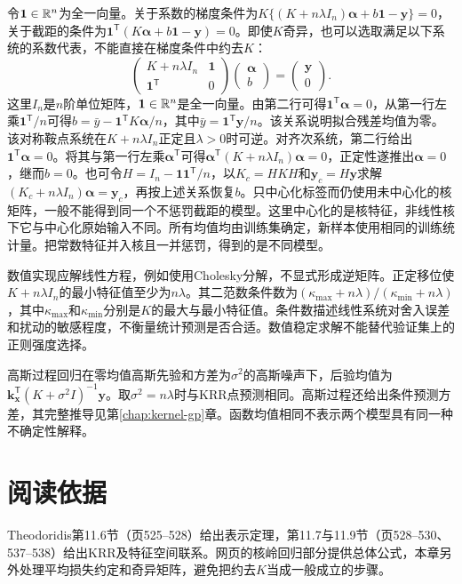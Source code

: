 令$\bm1\in\mathbb{R}^n$为全一向量。关于系数的梯度条件为$K\{(K+n\lambda I_n)\bm\alpha+b\bm1-\bm y\}=0$，关于截距的条件为$\bm1^{\mathsf T}(K\bm\alpha+b\bm1-\bm y)=0$。即使$K$奇异，也可以选取满足以下系统的系数代表，不能直接在梯度条件中约去$K$：
\begin{equation}
 \begin{pmatrix}K+n\lambda I_n&\bm1\\\bm1^{\mathsf T}&0\end{pmatrix}
 \begin{pmatrix}\bm\alpha\\b\end{pmatrix}
 =\begin{pmatrix}\bm y\\0\end{pmatrix}.
 \label{eq:krr-unpenalized-intercept}
\end{equation}
 这里$I_n$是$n$阶单位矩阵，$\bm1\in\mathbb{R}^n$是全一向量。由第二行可得$\bm1^{\mathsf T}\bm\alpha=0$，从第一行左乘$\bm1^{\mathsf T}/n$可得$b=\bar y-\bm1^{\mathsf T}K\bm\alpha/n$，其中$\bar y=\bm1^{\mathsf T}\bm y/n$。该关系说明拟合残差均值为零。该对称鞍点系统在$K+n\lambda I_n$正定且$\lambda>0$时可逆。对齐次系统，第二行给出$\bm1^{\mathsf T}\bm\alpha=0$。将其与第一行左乘$\bm\alpha^{\mathsf T}$可得$\bm\alpha^{\mathsf T}(K+n\lambda I_n)\bm\alpha=0$，正定性遂推出$\bm\alpha=0$，继而$b=0$。也可令$H=I_n-\bm1\bm1^{\mathsf T}/n$，以$K_c=HKH$和$\bm y_c=H\bm y$求解$(K_c+n\lambda I_n)\bm\alpha=\bm y_c$，再按上述关系恢复$b$。只中心化标签而仍使用未中心化的核矩阵，一般不能得到同一个不惩罚截距的模型。这里中心化的是核特征，非线性核下它与中心化原始输入不同。所有均值均由训练集确定，新样本使用相同的训练统计量。把常数特征并入核且一并惩罚，得到的是不同模型。

数值实现应解线性方程，例如使用Cholesky分解，不显式形成逆矩阵。正定移位使$K+n\lambda I_n$的最小特征值至少为$n\lambda$。其二范数条件数为$(\kappa_{\max}+n\lambda)/(\kappa_{\min}+n\lambda)$，其中$\kappa_{\max}$和$\kappa_{\min}$分别是$K$的最大与最小特征值。条件数描述线性系统对舍入误差和扰动的敏感程度，不衡量统计预测是否合适。数值稳定求解不能替代验证集上的正则强度选择。

高斯过程回归在零均值高斯先验和方差为$\sigma^2$的高斯噪声下，后验均值为$\bm k_{\bm x}^{\mathsf T}(K+\sigma^2I)^{-1}\bm y$。取$\sigma^2=n\lambda$时与KRR点预测相同。高斯过程还给出条件预测方差，其完整推导见第\ref{chap:kernel-gp}章。函数均值相同不表示两个模型具有同一种不确定性解释。

\section{阅读依据}
Theodoridis第11.6节（页525--528）给出表示定理，第11.7与11.9节（页528--530、537--538）给出KRR及特征空间联系。网页的核岭回归部分提供总体公式\cite{zheng2021kernel}，本章另外处理平均损失约定和奇异矩阵，避免把约去$K$当成一般成立的步骤。
